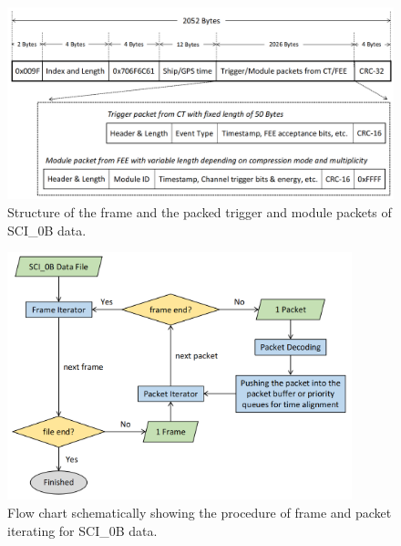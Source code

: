\documentclass{raa}
\begin{document}
\begin{figure}[!ht]
\centering
\includegraphics[width=14cm]{images/sci_data_frame.png}
\caption{Structure of the frame and the packed trigger and module packets of SCI\_0B data.}\label{fig:sciframe}
\end{figure}

\begin{figure}[!ht]
\centering
\includegraphics[width=10cm]{images/sci_data_decoding.png}
\caption{Flow chart schematically showing the procedure of frame and packet iterating for SCI\_0B data.}\label{fig:sciframe_iterating}
\end{figure}
\end{document}
